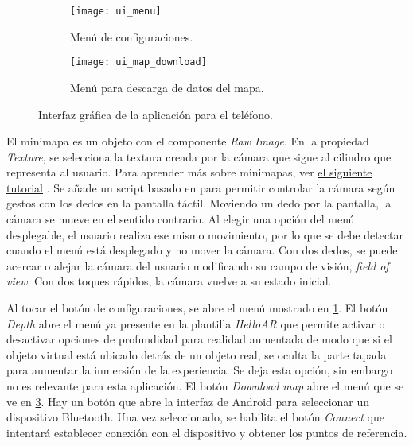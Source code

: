 \documentclass{article}
\newenvironment{standalone}{\begin{preview}}{\end{preview}}
\begin{document}
\begin{standalone}
\begin{figure}[ht!]
\begin{subfigure}[b]{0.65\textwidth}
   \texttt{[image: ui\_menu]}
   \caption{Menú de configuraciones.}
   \label{fig:ui_menu}
\end{subfigure}
\vspace{1em}

\begin{subfigure}[b]{0.65\textwidth}
   \texttt{[image: ui\_map\_download]}
   \caption{Menú para descarga de datos del mapa.}
   \label{fig:ui_map_download}
\end{subfigure}
\vspace{1em}

\caption{Interfaz gráfica de la aplicación para el teléfono.}
\end{figure}

El minimapa es un objeto con el componente \textit{Raw Image}.
En la propiedad \textit{Texture}, se selecciona la textura creada por la cámara que sigue al cilindro que representa al usuario.
Para aprender más sobre minimapas, ver \href{https://www.youtube.com/watch?v=28JTTXqMvOU}{el siguiente tutorial} \cite{miniMap}.
Se añade un script basado en \cite{indoorNavRacoons} para permitir controlar la cámara según gestos con los dedos en la pantalla táctil.
Moviendo un dedo por la pantalla, la cámara se mueve en el sentido contrario.
Al elegir una opción del menú desplegable, el usuario realiza ese mismo movimiento, por lo que se debe detectar cuando el menú está desplegado y no mover la cámara.
Con dos dedos, se puede acercar o alejar la cámara del usuario modificando su campo de visión, \textit{field of view}.
Con dos toques rápidos, la cámara vuelve a su estado inicial.

Al tocar el botón de configuraciones, se abre el menú mostrado en \cref{fig:ui_menu}.
El botón \textit{Depth} abre el menú ya presente en la plantilla \textit{HelloAR} que permite activar o desactivar opciones de profundidad para realidad aumentada de modo que si el objeto virtual está ubicado detrás de un objeto real, se oculta la parte tapada para aumentar la inmersión de la experiencia.
Se deja esta opción, sin embargo no es relevante para esta aplicación.
El botón \textit{Download map} abre el menú que se ve en \cref{fig:ui_map_download}.
Hay un botón que abre la interfaz de Android para seleccionar un dispositivo Bluetooth.
Una vez seleccionado, se habilita el botón \textit{Connect} que intentará establecer conexión con el dispositivo y obtener los puntos de referencia.

\end{standalone}
\end{document}
